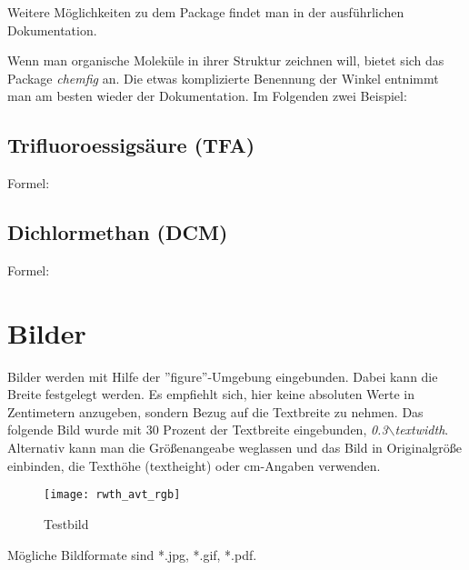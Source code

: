 	Weitere Möglichkeiten zu dem Package findet man in der ausführlichen Dokumentation.
	
	Wenn man organische Moleküle in ihrer Struktur zeichnen will, bietet sich das Package \emph{chemfig} an. Die etwas komplizierte Benennung der Winkel entnimmt man am besten wieder der Dokumentation. Im Folgenden zwei Beispiel:
	\subsection{Trifluoroessigsäure (TFA)}
		
			Formel:\quad {}
			\hspace*{3em}
			\hspace*{3em}
			\\[2ex]
			
		\subsection{Dichlormethan (DCM)}
			
			Formel:\quad {} 
			\hspace*{5em}
			\\[2ex]
			

\section{Bilder}

Bilder werden mit Hilfe der ''figure''-Umgebung eingebunden. Dabei
kann die Breite festgelegt werden. Es empfiehlt sich, hier keine
absoluten Werte in Zentimetern anzugeben, sondern Bezug auf die
Textbreite zu nehmen. Das folgende Bild wurde mit 30 Prozent der
Textbreite eingebunden, \emph{0.3$\backslash$textwidth}. Alternativ kann man die Größenangeabe weglassen und das Bild in Originalgröße einbinden, die Texthöhe (textheight) oder cm-Angaben verwenden.


	\begin{figure}[h!bt]	%
		\begin{center}
		  \texttt{[image: rwth\_avt\_rgb]}
		  \caption{Testbild}\label{fig:Testbild}
		\end{center}
	\end{figure}


Mögliche Bildformate sind *.jpg, *.gif, *.pdf.

